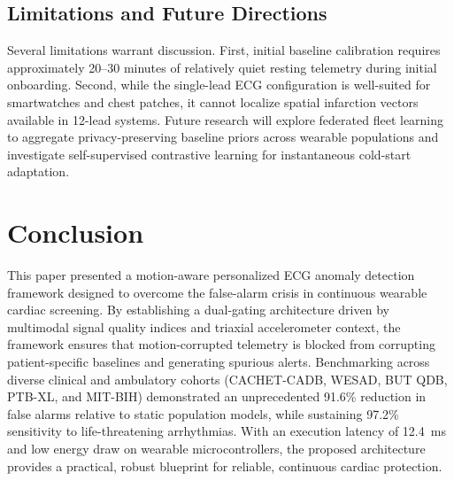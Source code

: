 \documentclass{ieeeaccess}
\begin{document}
\subsection{Limitations and Future Directions}
Several limitations warrant discussion. First, initial baseline calibration requires approximately 20--30 minutes of relatively quiet resting telemetry during initial onboarding. Second, while the single-lead ECG configuration is well-suited for smartwatches and chest patches, it cannot localize spatial infarction vectors available in 12-lead systems. Future research will explore federated fleet learning to aggregate privacy-preserving baseline priors across wearable populations and investigate self-supervised contrastive learning for instantaneous cold-start adaptation.

\section{Conclusion}
\label{sec:conclusion}

This paper presented a motion-aware personalized ECG anomaly detection framework designed to overcome the false-alarm crisis in continuous wearable cardiac screening. By establishing a dual-gating architecture driven by multimodal signal quality indices and triaxial accelerometer context, the framework ensures that motion-corrupted telemetry is blocked from corrupting patient-specific baselines and generating spurious alerts. Benchmarking across diverse clinical and ambulatory cohorts (CACHET-CADB, WESAD, BUT QDB, PTB-XL, and MIT-BIH) demonstrated an unprecedented 91.6\% reduction in false alarms relative to static population models, while sustaining 97.2\% sensitivity to life-threatening arrhythmias. With an execution latency of 12.4~ms and low energy draw on wearable microcontrollers, the proposed architecture provides a practical, robust blueprint for reliable, continuous cardiac protection.
\end{document}
